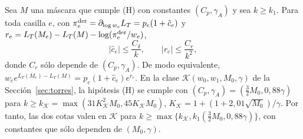 \begin{teorema}\label{teo:insercion-torres}
Sea $M$ una máscara que cumple \textup{(H)} con constantes $(C_p,\gamma_A)$ y sea $k\ge k_1$. Para toda
casilla $e$, con $\pi^{\rm der}_e=\partial_{\log w_e}L_T=p_e(1+\hat c_e)$ y
$r_e=L_T(M_e)-L_T(M)-\log(\pi^{\rm der}_e/w_e)$,
\[
 |\hat c_e|\le\frac{C_\delta}{k},\qquad |r_e|\le\frac{C_r}{k^2},
\]
donde $C_r$ sólo depende de $(C_p,\gamma_A)$. De modo equivalente, $w_ee^{L_T(M_e)-L_T(M)}=p_e(1+\hat
c_e)e^{r_e}$. En la clase $\mathcal K(w_0,w_1,M_0,\gamma)$ de la Sección~\ref{sec:torres}, la hipótesis
\textup{(H)} se cumple con $(C_p,\gamma_A)=(\tfrac32M_0,0{,}88\gamma)$ para $k\ge k_{\mathcal K}=
\max(31K_{\mathcal K}^2M_0,45K_{\mathcal K}M_0)$, $K_{\mathcal K}=1+(1+2{,}01\sqrt{M_0})/\gamma$. Por
tanto, las dos cotas valen en $\mathcal K$ para $k\ge\max\{k_{\mathcal K},k_1(\tfrac32M_0,0{,}88\gamma)\}$,
con constantes que sólo dependen de $(M_0,\gamma)$.
\end{teorema}
